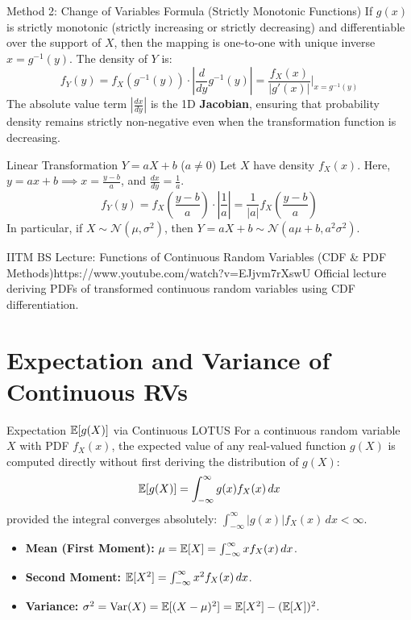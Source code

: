 \begin{theorembox}{Method 2: Change of Variables Formula (Strictly Monotonic Functions)}
If $g(x)$ is strictly monotonic (strictly increasing or strictly decreasing) and differentiable over the support of $X$, then the mapping is one-to-one with unique inverse $x = g^{-1}(y)$. The density of $Y$ is:
$$f_Y(y) = f_X(g^{-1}(y)) \cdot \left| \frac{d}{dy} g^{-1}(y) \right| = \frac{f_X(x)}{\left| g'(x) \right|} \Bigg|_{x = g^{-1}(y)}$$
The absolute value term $\left| \frac{dx}{dy} \right|$ is the 1D \textbf{Jacobian}, ensuring that probability density remains strictly non-negative even when the transformation function is decreasing.
\end{theorembox}

\begin{examplebox}{Linear Transformation $Y = aX + b$ ($a \neq 0$)}
Let $X$ have density $f_X(x)$. Here, $y = ax + b \implies x = \frac{y - b}{a}$, and $\frac{dx}{dy} = \frac{1}{a}$.
$$f_Y(y) = f_X\left(\frac{y - b}{a}\right) \cdot \left| \frac{1}{a} \right| = \frac{1}{|a|} f_X\left(\frac{y - b}{a}\right)$$
In particular, if $X \sim \mathcal{N}(\mu, \sigma^2)$, then $Y = aX + b \sim \mathcal{N}(a\mu + b, a^2 \sigma^2)$.
\end{examplebox}

\begin{videocard}{IITM BS Lecture: Functions of Continuous Random Variables (CDF \& PDF Methods)}{https://www.youtube.com/watch?v=EJjvm7rXswU}
Official lecture deriving PDFs of transformed continuous random variables using CDF differentiation.
\end{videocard}

\section{Expectation and Variance of Continuous RVs}

\begin{definitionbox}{Expectation $\mathbb{E}[g(X)]$ via Continuous LOTUS}
For a continuous random variable $X$ with PDF $f_X(x)$, the expected value of any real-valued function $g(X)$ is computed directly without first deriving the distribution of $g(X)$:
$$\mathbb{E}[g(X)] = \int_{-\infty}^{\infty} g(x) f_X(x) \, dx$$
provided the integral converges absolutely: $\int_{-\infty}^{\infty} |g(x)| f_X(x) \, dx < \infty$.
\begin{itemize}
    \item \textbf{Mean (First Moment):} $\mu = \mathbb{E}[X] = \int_{-\infty}^{\infty} x f_X(x) \, dx$.
    \item \textbf{Second Moment:} $\mathbb{E}[X^2] = \int_{-\infty}^{\infty} x^2 f_X(x) \, dx$.
    \item \textbf{Variance:} $\sigma^2 = \operatorname{Var}(X) = \mathbb{E}[(X - \mu)^2] = \mathbb{E}[X^2] - (\mathbb{E}[X])^2$.
\end{itemize}
\end{definitionbox}

